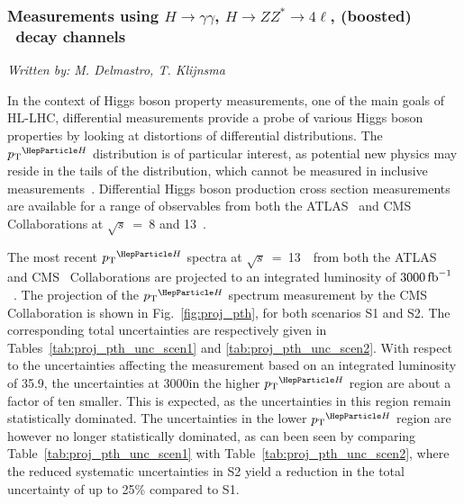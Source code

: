 \subsubsection{Measurements using $H \to \gamma\gamma$, $H \to ZZ^* \to 4\ell$, (boosted) \Hbb\ decay channels}
\label{sec:diffxs}
\begin{center}{\it Written by: M. Delmastro, T. Klijnsma} \end{center}


\noindent In the context of Higgs boson property measurements, one of the main goals of HL-LHC, differential measurements provide a probe of various Higgs boson properties by looking at distortions of differential distributions.
% 
The $\pTH$ distribution is of particular interest, as potential new physics may reside in the tails of the distribution, which cannot be measured in inclusive measurements~\cite{%
Khachatryan:2016vau,%
Aad:2015zhl,%
CMS:2018lkl%
}.
% 
Differential Higgs boson production cross section measurements are available for a range of observables from both the ATLAS~\cite{%
Aad:2014lwa,%
Aad:2014tca,%
Aad:2016lvc,%
Aaboud:2018xdt,%
Aaboud:2017oem,%
Aaboud:2018ezd%
} and CMS~\cite{%
Khachatryan:2015rxa,%
Khachatryan:2015yvw,%
Khachatryan:2016vnn,%
Sirunyan:2018kta,%
Sirunyan:2017exp,
CMS-PAS-HIG-17-028%
} Collaborations at $\sqrt{s}$~=~8 and 13~\UTeV.

The most recent $\pTH$ spectra at $\sqrt{s}$~=~13~\UTeV\ from both the ATLAS~\cite{Aaboud:2018ezd} and CMS~\cite{CMS-PAS-HIG-17-028} Collaborations are projected to an integrated luminosity of $3000\mbox{\ensuremath{\,\text{fb}^\text{$-$1}}}$~\cite{CMS-PAS-FTR-18-011, ATL-PHYS-PUB-2018-040}.
The projection of the $\pTH$ spectrum measurement by the CMS Collaboration is shown in Fig.~\ref{fig:proj_pth}, for both scenarios S1 and S2. The corresponding total uncertainties are respectively given in Tables~\ref{tab:proj_pth_unc_scen1} and \ref{tab:proj_pth_unc_scen2}. With respect to the uncertainties affecting the measurement based on an integrated luminosity of 35.9\fbinv, the uncertainties at 3000\fbinv in the higher $\pTH$ region are about a factor of ten smaller. This is expected, as the uncertainties in this region remain statistically dominated.
The uncertainties in the lower $\pTH$ region are however no longer statistically dominated, as can been seen by comparing Table~\ref{tab:proj_pth_unc_scen1} with Table~\ref{tab:proj_pth_unc_scen2}, where the reduced systematic uncertainties in S2 yield a reduction in the total uncertainty of up to 25\% compared to S1.

